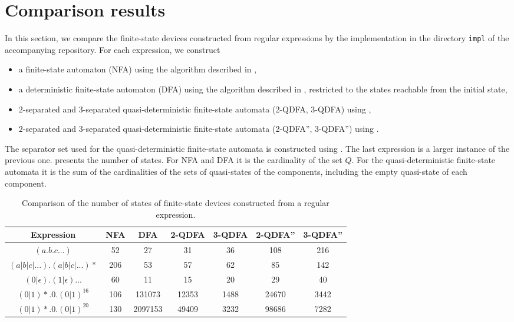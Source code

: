 \section{Comparison results}
\label{section:comparison_result}

In this section, we compare the finite-state devices constructed from regular
expressions by the implementation in the directory \texttt{impl} of the accompanying
repository. For each expression, we construct
\begin{itemize}
  \item a finite-state automaton (NFA) using the algorithm described in
    ,
  \item a deterministic finite-state automaton (DFA) using the algorithm described in
    , restricted to the states reachable from the initial state,
  \item $2$-separated and $3$-separated quasi-deterministic finite-state automata
    (2-QDFA, 3-QDFA) using ,
  \item $2$-separated and $3$-separated quasi-deterministic finite-state automata
    (2-QDFA'', 3-QDFA'') using .
\end{itemize}
The separator set used for the quasi-deterministic finite-state automata is
constructed using . The last expression is a larger
instance of the previous one.
\bigbreak
{} presents the number of states. For NFA and DFA it is the
cardinality of the set $Q$. For the quasi-deterministic finite-state automata it is the
sum of the cardinalities of the sets of quasi-states of the components, including the
empty quasi-state of each component.

\begin{table}[ht]
  \centering
  \small
  \setlength{\tabcolsep}{4pt}
  \begin{tabular}{||c c c c c c c||}
    \hline
    Expression & NFA & DFA & 2-QDFA & 3-QDFA & 2-QDFA'' & 3-QDFA'' \\ [0.5ex]
    \hline
    $(a.b.c...)$ & 52 & 27 & 31 & 36 & 108 & 216 \\
    \hline
    $(a|b|c|...).(a|b|c|...)*$ & 206 & 53 & 57 & 62 & 85 & 142 \\
    \hline
    $(0|\epsilon).(1|\epsilon)...$ & 60 & 11 & 15 & 20 & 29 & 40 \\
    \hline
    $(0|1)*.0.(0|1)^{16}$ & 106 & 131073 & 12353 & 1488 & 24670 & 3442 \\
    \hline
    $(0|1)*.0.(0|1)^{20}$ & 130 & 2097153 & 49409 & 3232 & 98686 & 7282 \\
    \hline
  \end{tabular}
  \caption{Comparison of the number of states of finite-state devices constructed
    from a regular expression.}
  \label{tbl:state_comparison}
\end{table}

